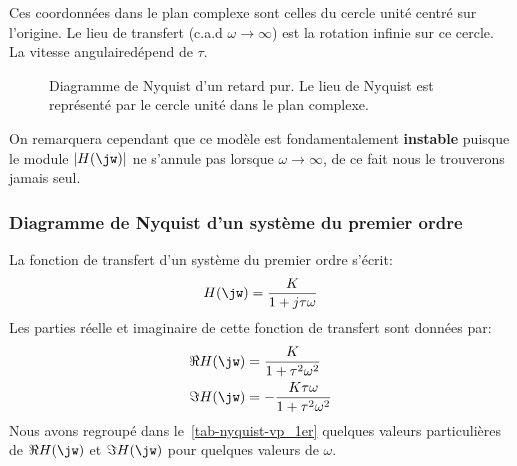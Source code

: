 Ces coordonnées dans le plan complexe sont celles du cercle unité 
centré sur l'origine. Le lieu de transfert (c.a.d $\omega\to\infty$) 
est la rotation infinie sur ce cercle. La \og vitesse angulaire\fg dépend 
de $\tau$.

\begin{figure}[!h]
\begin{center}
\end{center}
\caption{Diagramme de Nyquist d'un retard pur. Le lieu de Nyquist 
         est représenté par le cercle unité dans le plan complexe.
         \label{fig-nyquist_4}}
\end{figure}

On remarquera cependant que ce modèle est fondamentalement 
\textbf{instable} puisque le module $|H(\jw)|$ ne s'annule pas 
lorsque $\omega\to\infty$, de ce fait nous le trouverons jamais seul.

\newpage
\subsubsection{Diagramme de Nyquist d'un système du premier ordre}

La fonction de transfert d'un système du premier ordre s'écrit:
$$
H(\jw)=\dfrac{K}{1+j\tau\omega}
$$
Les parties réelle et imaginaire de cette fonction de transfert sont données 
par:
\begin{align*}
    \Re{H(\jw)}&=\dfrac{K}{1+\tau^2\omega^2}\\
    \Im{H(\jw)}&=-\dfrac{K\tau\omega}{1+\tau^2\omega^2}\\
\end{align*}
Nous avons regroupé dans le~\cref{tab-nyquist-vp_1er} quelques valeurs 
particulières de $\Re{H(\jw)}$ et $\Im{H(\jw)}$ pour quelques valeurs 
de $\omega$.

